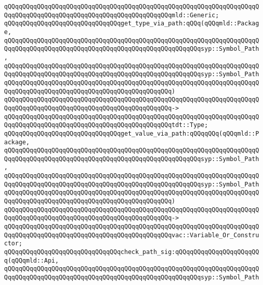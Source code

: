 \verb|qQQqqQQqqQQqqQQqqQQqqQQqqQQqqQQqqQQqqQQqqQQqqQQqqQQqqQQqqQQqqQQqqQQqqQQqqQQqqQQqqQQqqQQqqQQqqQQqqQQqqQQqqQQqqQQqqQQqmld::Generic;|\newline
\newline
\verb|qQQqqQQqqQQqqQQqqQQqqQQqqQQqqQQqget_type_via_path:qQQq(qQQqmld::Package,|\newline
\verb|qQQqqQQqqQQqqQQqqQQqqQQqqQQqqQQqqQQqqQQqqQQqqQQqqQQqqQQqqQQqqQQqqQQqqQQqqQQqqQQqqQQqqQQqqQQqqQQqqQQqqQQqqQQqqQQqqQQqqQQqqQQqsyp::Symbol_Path,|\newline
\verb|qQQqqQQqqQQqqQQqqQQqqQQqqQQqqQQqqQQqqQQqqQQqqQQqqQQqqQQqqQQqqQQqqQQqqQQqqQQqqQQqqQQqqQQqqQQqqQQqqQQqqQQqqQQqqQQqqQQqqQQqqQQqsyp::Symbol_Path|\newline
\verb|qQQqqQQqqQQqqQQqqQQqqQQqqQQqqQQqqQQqqQQqqQQqqQQqqQQqqQQqqQQqqQQqqQQqqQQqqQQqqQQqqQQqqQQqqQQqqQQqqQQqqQQqqQQqqQQqqQQq)|\newline
\verb|qQQqqQQqqQQqqQQqqQQqqQQqqQQqqQQqqQQqqQQqqQQqqQQqqQQqqQQqqQQqqQQqqQQqqQQqqQQqqQQqqQQqqQQqqQQqqQQqqQQqqQQqqQQqqQQqqQQq->|\newline
\verb|qQQqqQQqqQQqqQQqqQQqqQQqqQQqqQQqqQQqqQQqqQQqqQQqqQQqqQQqqQQqqQQqqQQqqQQqqQQqqQQqqQQqqQQqqQQqqQQqqQQqqQQqqQQqqQQqqQQqtdt::Type;|\newline
\newline
\verb|qQQqqQQqqQQqqQQqqQQqqQQqqQQqqQQqget_value_via_path:qQQqqQQq(qQQqmld::Package,|\newline
\verb|qQQqqQQqqQQqqQQqqQQqqQQqqQQqqQQqqQQqqQQqqQQqqQQqqQQqqQQqqQQqqQQqqQQqqQQqqQQqqQQqqQQqqQQqqQQqqQQqqQQqqQQqqQQqqQQqqQQqqQQqqQQqsyp::Symbol_Path,|\newline
\verb|qQQqqQQqqQQqqQQqqQQqqQQqqQQqqQQqqQQqqQQqqQQqqQQqqQQqqQQqqQQqqQQqqQQqqQQqqQQqqQQqqQQqqQQqqQQqqQQqqQQqqQQqqQQqqQQqqQQqqQQqqQQqsyp::Symbol_Path|\newline
\verb|qQQqqQQqqQQqqQQqqQQqqQQqqQQqqQQqqQQqqQQqqQQqqQQqqQQqqQQqqQQqqQQqqQQqqQQqqQQqqQQqqQQqqQQqqQQqqQQqqQQqqQQqqQQqqQQqqQQq)|\newline
\verb|qQQqqQQqqQQqqQQqqQQqqQQqqQQqqQQqqQQqqQQqqQQqqQQqqQQqqQQqqQQqqQQqqQQqqQQqqQQqqQQqqQQqqQQqqQQqqQQqqQQqqQQqqQQqqQQqqQQq->|\newline
\verb|qQQqqQQqqQQqqQQqqQQqqQQqqQQqqQQqqQQqqQQqqQQqqQQqqQQqqQQqqQQqqQQqqQQqqQQqqQQqqQQqqQQqqQQqqQQqqQQqqQQqqQQqqQQqqQQqqQQqvac::Variable_Or_Constructor;|\newline
\newline
\verb|qQQqqQQqqQQqqQQqqQQqqQQqqQQqqQQqcheck_path_sig:qQQqqQQqqQQqqQQqqQQqqQQq(qQQqmld::Api,|\newline
\verb|qQQqqQQqqQQqqQQqqQQqqQQqqQQqqQQqqQQqqQQqqQQqqQQqqQQqqQQqqQQqqQQqqQQqqQQqqQQqqQQqqQQqqQQqqQQqqQQqqQQqqQQqqQQqqQQqqQQqqQQqqQQqsyp::Symbol_Path|\newline
